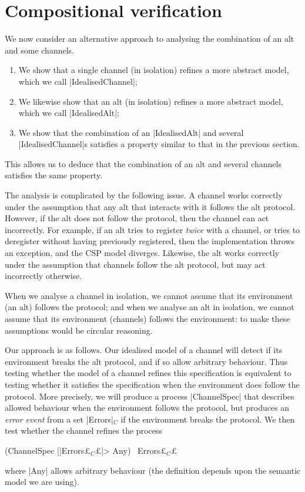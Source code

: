\section{Compositional verification}

\inlineCSP

We now consider an alternative approach to analysing the combination of an alt
and some channels.
%
\begin{enumerate}
\item We show that a single channel (in isolation) refines a more abstract
  model, which we call |IdealisedChannel|;

\item We likewise show that an alt (in isolation) refines a more abstract
  model, which we call |IdealisedAlt|;

\item We show that the combination of an |IdealisedAlt| and several
  |IdealisedChannel|s satisfies a property similar to that in the previous
  section. 
\end{enumerate}
%
This allows us to deduce that the combination of an alt and several channels
satisfies the same property. 

The analysis is complicated by the following issue.  A channel works correctly
under the assumption that any alt that interacts with it follows the alt
protocol.  However, if the alt does not follow the protocol, then the channel
can act incorrectly.  For example, if an alt tries to register \emph{twice}
with a channel, or tries to deregister without having previously registered,
then the implementation throws an exception, and the CSP model diverges.
Likewise, the alt works correctly under the assumption that channels follow
the alt protocol, but may act incorrectly otherwise.

When we analyse a channel in isolation, we cannot assume that its environment
(an alt) follows the protocol; and when we analyse an alt in isolation, we
cannot assume that its environment (channels) follows the environment: to make
these assumptions would be circular reasoning. 

Our approach is as follows.  Our idealised model of a channel will detect if
its environment breaks the alt protocol, and if so allow arbitrary behaviour.
Thus testing whether the model of a channel refines this specification is
equivalent to testing whether it satisfies the specification when the
environment does follow the protocol.  More precisely, we will produce a
process |ChannelSpec| that describes allowed behaviour when the environment
follows the protocol, but produces an \emph{error event} from a set
|Errors|$_C$ if the environment breaks the protocol.  We then test whether the
channel refines the process
%
\begin{cspm}
(ChannelSpec [|Errors£$_C$£|> Any) \ Errors£$_C$£
\end{cspm}
%
where |Any| allows arbitrary behaviour (the definition depends upon the
semantic model we are using).  

